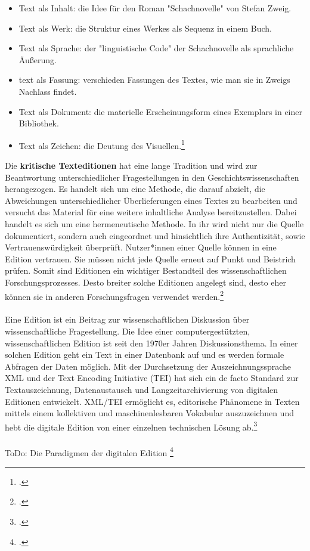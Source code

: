 \documentclass[12pt,a4paper]{article}
\begin{document}
\begin{itemize}
    \item Text als Inhalt: die Idee für den Roman "Schachnovelle" von Stefan Zweig.
    \item Text als Werk: die Struktur eines Werkes als Sequenz in einem Buch.
    \item Text als Sprache: der "linguistische Code" der Schachnovelle als sprachliche Äußerung.
    \item text als Fassung: verschieden Fassungen des Textes, wie man sie in Zweigs Nachlass findet.
    \item Text als Dokument: die materielle Erscheinungsform eines Exemplars in einer Bibliothek.
    \item Text als Zeichen: die Deutung des Visuellen.\footcite[][S.46]{sahle2013digitale}
\end{itemize}
Die \textbf{kritische Texteditionen} hat eine lange Tradition und wird zur Beantwortung unterschiedlicher Fragestellungen in den Geschichtswissenschaften herangezogen. Es handelt sich um eine Methode, die darauf abzielt, die Abweichungen unterschiedlicher Überlieferungen eines Textes zu bearbeiten und versucht das Material für eine weitere inhaltliche Analyse bereitzustellen. Dabei handelt es sich um eine hermeneutische Methode. In ihr wird nicht nur die Quelle dokumentiert, sondern auch eingeordnet und hinsichtlich ihre Authentizität, sowie Vertrauenswürdigkeit überprüft. Nutzer*innen einer Quelle  können in eine Edition vertrauen. Sie müssen nicht jede Quelle erneut auf Punkt und Beistrich prüfen. Somit sind Editionen ein wichtiger Bestandteil des wissenschaftlichen Forschungsprozesses. Desto breiter solche Editionen angelegt sind, desto eher können sie in anderen Forschungsfragen verwendet werden.\footcite[][S.101-144]{aumann1999digital}
\\
\\
Eine Edition ist ein Beitrag zur wissenschaftlichen Diskussion über wissenschaftliche Fragestellung. Die Idee einer computergestützten, wissenschaftlichen Edition ist seit den 1970er Jahren Diskussionsthema. In einer solchen Edition geht ein Text in einer Datenbank auf und es werden formale Abfragen der Daten möglich. Mit der Durchsetzung der Auszeichnungssprache XML und der Text Encoding Initiative (TEI) hat sich ein de facto Standard zur Textauszeichnung, Datenaustausch und Langzeitarchivierung von digitalen Editionen entwickelt. XML/TEI ermöglicht es, editorische Phänomene in Texten mittels einem kollektiven und maschinenlesbaren Vokabular auszuzeichnen und hebt die digitale Edition von einer einzelnen technischen  Lösung ab.\footcite[][S.180-181]{vogeler2018religion}
\\
\\
ToDo: Die Paradigmen der digitalen Edition \footcite[][S.240-241]{sahle2017dhedition}
\end{document}
